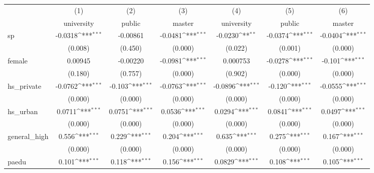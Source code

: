 {
\def\sym#1{\ifmmode^{#1}\else\(^{#1}\)\fi}
\begin{tabular}{l*{6}{c}}
\hline\hline
            &\multicolumn{1}{c}{(1)}&\multicolumn{1}{c}{(2)}&\multicolumn{1}{c}{(3)}&\multicolumn{1}{c}{(4)}&\multicolumn{1}{c}{(5)}&\multicolumn{1}{c}{(6)}\\
            &\multicolumn{1}{c}{university}&\multicolumn{1}{c}{public}&\multicolumn{1}{c}{master}&\multicolumn{1}{c}{university}&\multicolumn{1}{c}{public}&\multicolumn{1}{c}{master}\\
\hline
sp          &     -0.0318\sym{***}&    -0.00861         &     -0.0481\sym{***}&     -0.0230\sym{**} &     -0.0374\sym{***}&     -0.0404\sym{***}\\
            &     (0.008)         &     (0.450)         &     (0.000)         &     (0.022)         &     (0.001)         &     (0.000)         \\
[1em]
female      &     0.00945         &    -0.00220         &     -0.0981\sym{***}&    0.000753         &     -0.0278\sym{***}&      -0.101\sym{***}\\
            &     (0.180)         &     (0.757)         &     (0.000)         &     (0.902)         &     (0.000)         &     (0.000)         \\
[1em]
hs\_private  &     -0.0762\sym{***}&      -0.103\sym{***}&     -0.0763\sym{***}&     -0.0896\sym{***}&      -0.120\sym{***}&     -0.0555\sym{***}\\
            &     (0.000)         &     (0.000)         &     (0.000)         &     (0.000)         &     (0.000)         &     (0.000)         \\
[1em]
hs\_urban    &      0.0711\sym{***}&      0.0751\sym{***}&      0.0536\sym{***}&      0.0294\sym{***}&      0.0841\sym{***}&      0.0497\sym{***}\\
            &     (0.000)         &     (0.000)         &     (0.000)         &     (0.000)         &     (0.000)         &     (0.000)         \\
[1em]
general\_high&       0.556\sym{***}&       0.229\sym{***}&       0.204\sym{***}&       0.635\sym{***}&       0.275\sym{***}&       0.167\sym{***}\\
            &     (0.000)         &     (0.000)         &     (0.000)         &     (0.000)         &     (0.000)         &     (0.000)         \\
[1em]
paedu       &       0.101\sym{***}&       0.118\sym{***}&       0.156\sym{***}&      0.0829\sym{***}&       0.108\sym{***}&       0.105\sym{***}\\

\end{tabular}}
